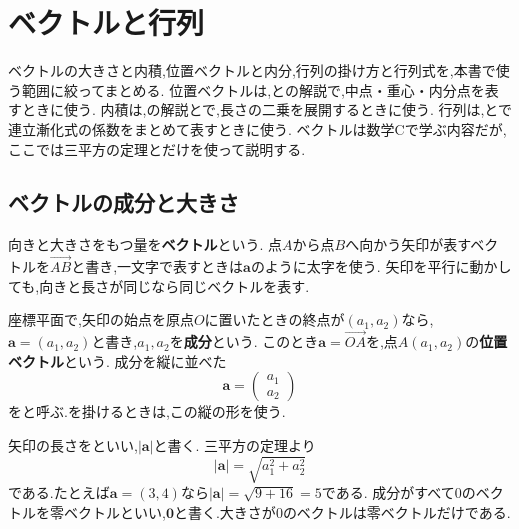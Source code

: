 
\section{ベクトルと行列}\label{節：ベクトルと行列}
ベクトルの大きさと内積,位置ベクトルと内分,行列の掛け方と行列式を,本書で使う範囲に絞ってまとめる.
位置ベクトルは,との解説で,中点・重心・内分点を表すときに使う.
内積は,の解説とで,長さの二乗を展開するときに使う.
行列は,とで連立漸化式の係数をまとめて表すときに使う.
ベクトルは数学Cで学ぶ内容だが,ここでは三平方の定理とだけを使って説明する.

\subsection{ベクトルの成分と大きさ}\label{節：ベクトルの成分と大きさ}
向きと大きさをもつ量を\textbf{ベクトル}という.
点$A$から点$B$へ向かう矢印が表すベクトルを$\overrightarrow{AB}$と書き,一文字で表すときは$\boldsymbol a$のように太字を使う.
矢印を平行に動かしても,向きと長さが同じなら同じベクトルを表す.

座標平面で,矢印の始点を原点$O$に置いたときの終点が$(a_1,a_2)$なら,$\boldsymbol a=(a_1,a_2)$と書き,$a_1,a_2$を\textbf{成分}という.
このとき$\boldsymbol a=\overrightarrow{OA}$を,点$A(a_1,a_2)$の\textbf{位置ベクトル}という.
成分を縦に並べた
\[
  \boldsymbol a=\begin{pmatrix}a_1\\a_2\end{pmatrix}
\]
を\textbf{}と呼ぶ.を掛けるときは,この縦の形を使う.

矢印の長さを\textbf{}といい,$|\boldsymbol a|$と書く.
三平方の定理より
\[
  |\boldsymbol a|=\sqrt{a_1^2+a_2^2}
\]
である.たとえば$\boldsymbol a=(3,4)$なら$|\boldsymbol a|=\sqrt{9+16}=5$である.
成分がすべて$0$のベクトルを零ベクトルといい,$\boldsymbol 0$と書く.大きさが$0$のベクトルは零ベクトルだけである.


